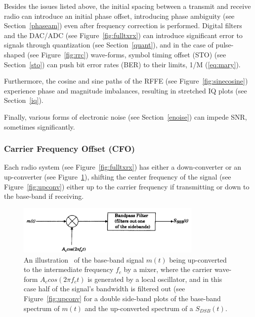 Besides the issues listed above, the initial spacing between a transmit and receive radio can introduce an initial phase offset, introducing phase ambiguity (see Section~\ref{phaseam}) even after frequency correction is performed. Digital filters and the DAC/ADC (see Figure~\ref{fig:fulltxrx}) can introduce significant error to signals through quantization (see Section~\ref{quant}), and in the case of pulse-shaped (see Figure~\ref{fig:rrc}) wave-forms, symbol timing offset (STO) (see Section~\ref{sto}) can push bit error rates (BER) to their limits, 1/M (\ref{eq:mary}).

Furthermore, the cosine and sine paths of the RFFE (see Figure~\ref{fig:sinecosine}) experience phase and magnitude imbalances, resulting in stretched IQ plots (see Section~\ref{iq}).

Finally, various forms of electronic noise (see Section~\ref{enoise}) can impede SNR, sometimes significantly.
\subsubsection{Carrier Frequency Offset (CFO)}
\label{cfo}
Each radio system (see Figure~\ref{fig:fulltxrx}) has either a down-converter or an up-converter (see Figure~\ref{fig:mixer}), shifting the center frequency of the signal (see Figure~\ref{fig:upconv}) either up to the carrier frequency if transmitting or down to the base-band if receiving. 

\FloatBarrier
\begin{figure}[ht!]
	\centering	\includegraphics[width=0.8\textwidth,keepaspectratio]{figs/mixer.png}
    \caption{An illustration~\cite{rappaport1996wireless} of the base-band signal $m(t)$ being up-converted to the intermediate frequency $f_c$ by a mixer, where the carrier wave-form $A_c cos(2\pi f_c t)$ is generated by a local oscillator, and in this case half of the signal's bandwidth is filtered out (see Figure~\ref{fig:upconv} for a double side-band plots of the base-band spectrum of $m(t)$ and the up-converted spectrum of a $S_{DSB}(t)$.} 
\label{fig:mixer}      
\end{figure}

